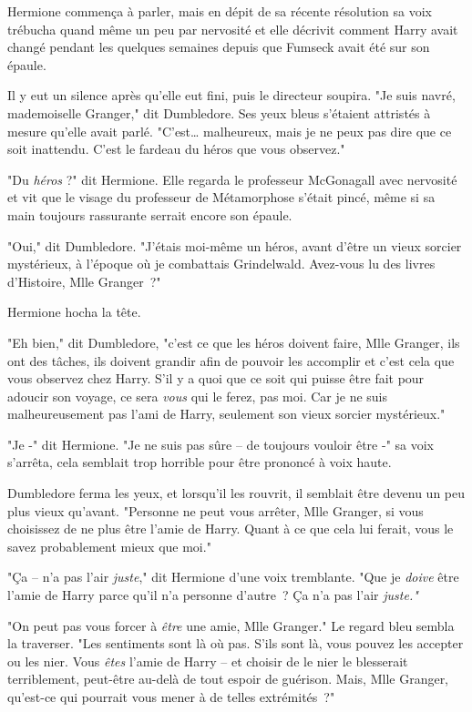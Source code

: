 Hermione commença à parler, mais en dépit de sa récente résolution sa voix trébucha quand même un peu par nervosité et elle décrivit comment Harry avait changé pendant les quelques semaines depuis que Fumseck avait été sur son épaule.

Il y eut un silence après qu'elle eut fini, puis le directeur soupira. "Je suis navré, mademoiselle Granger," dit Dumbledore. Ses yeux bleus s'étaient attristés à mesure qu'elle avait parlé. "C'est… malheureux, mais je ne peux pas dire que ce soit inattendu. C'est le fardeau du héros que vous observez."

"Du \emph{héros} ?" dit Hermione. Elle regarda le professeur McGonagall avec nervosité et vit que le visage du professeur de Métamorphose s'était pincé, même si sa main toujours rassurante serrait encore son épaule.

"Oui," dit Dumbledore. "J'étais moi-même un héros, avant d'être un vieux sorcier mystérieux, à l'époque où je combattais Grindelwald. Avez-vous lu des livres d'Histoire, Mlle Granger~?"

Hermione hocha la tête.

"Eh bien," dit Dumbledore, "c'est ce que les héros doivent faire, Mlle Granger, ils ont des tâches, ils doivent grandir afin de pouvoir les accomplir et c'est cela que vous observez chez Harry. S'il y a quoi que ce soit qui puisse être fait pour adoucir son voyage, ce sera \emph{vous} qui le ferez, pas moi. Car je ne suis malheureusement pas l'ami de Harry, seulement son vieux sorcier mystérieux."

"Je -" dit Hermione. "Je ne suis pas sûre -- de toujours vouloir être -" sa voix s'arrêta, cela semblait trop horrible pour être prononcé à voix haute.

Dumbledore ferma les yeux, et lorsqu'il les rouvrit, il semblait être devenu un peu plus vieux qu'avant. "Personne ne peut vous arrêter, Mlle Granger, si vous choisissez de ne plus être l'amie de Harry. Quant à ce que cela lui ferait, vous le savez probablement mieux que moi."

"Ça -- n'a pas l'air \emph{juste}," dit Hermione d'une voix tremblante. "Que je \emph{doive} être l'amie de Harry parce qu'il n'a personne d'autre~? Ça n'a pas l'air \emph{juste."}

"On peut pas vous forcer à \emph{être} une amie, Mlle Granger." Le regard bleu sembla la traverser. "Les sentiments sont là où pas. S'ils sont là, vous pouvez les accepter ou les nier. Vous \emph{êtes} l'amie de Harry -- et choisir de le nier le blesserait terriblement, peut-être au-delà de tout espoir de guérison. Mais, Mlle Granger, qu'est-ce qui pourrait vous mener à de telles extrémités~?"

